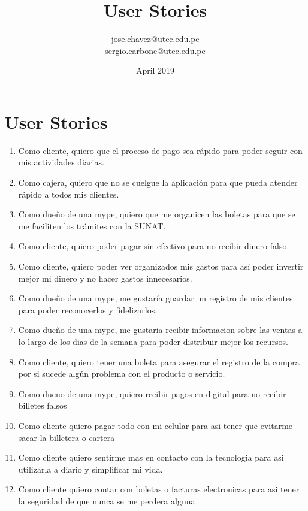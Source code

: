 \documentclass{article}
\title{User Stories}
\author{jose.chavez@utec.edu.pe\\sergio.carbone@utec.edu.pe }
\date{April 2019}
\begin{document}
\maketitle

\section{User Stories}
\begin{enumerate}

    \item Como cliente, quiero que el proceso de pago sea rápido para poder seguir con mis actividades diarias.
    \item Como cajera, quiero que no se cuelgue la aplicación para que pueda atender rápido a todos mis clientes.
    \item Como dueño de una mype, quiero que me organicen las boletas para que se me faciliten los trámites con la SUNAT.
    \item Como cliente, quiero poder pagar sin efectivo para no recibir dinero falso.  
    \item Como cliente, quiero poder ver organizados mis gastos para así poder invertir mejor mi dinero y no hacer gastos innecesarios.
    \item Como dueño de una mype, me gustaría guardar un registro de mis clientes para poder reconocerlos y fidelizarlos.
    \item Como dueño de una mype, me gustaria recibir informacion sobre las ventas a lo largo de los dias de la semana para poder distribuir mejor los recursos.
    \item Como cliente, quiero tener una boleta para asegurar el registro de la compra por si sucede algún problema con el producto o servicio.
    \item Como dueno de una mype, quiero recibir pagos en digital para no recibir billetes falsos
    \item Como cliente quiero pagar todo con mi celular para asi tener que evitarme sacar la billetera o cartera
    \item Como cliente quiero sentirme mas en contacto con la tecnologia para asi utilizarla a diario y simplificar mi vida.
    \item Como cliente quiero contar con boletas o facturas electronicas para asi tener la seguridad de que nunca se me perdera alguna
 

\end{enumerate}
\end{document}
